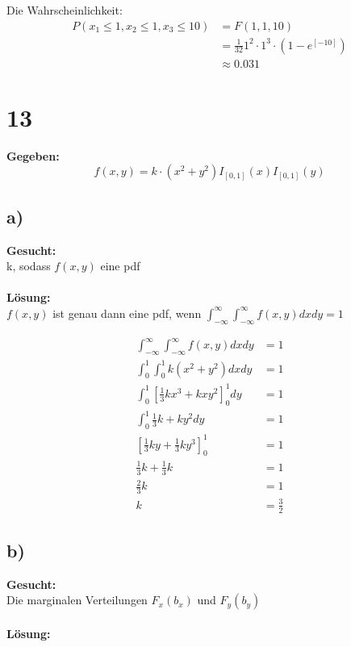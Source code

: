 \documentclass{article}
\begin{document}
Die Wahrscheinlichkeit:
\begin{align*}
    P(x_1 \leq 1, x_2 \leq 1, x_3 \leq 10) &= F(1, 1, 10 ) \\
    &= \frac{1}{32} 1^2 \cdot 1^3 \cdot (1- e^{[-10]}) \\
    &\approx 0.031
\end{align*}

\section*{13}
\textbf{Gegeben:}\\

\[f(x,y) = k \cdot (x^2 + y^2)I_{[0,1]}(x)I_{[0,1]}(y)\]
\subsection*{a)}
\textbf{Gesucht:} \\

k, sodass $f(x,y)$ eine pdf\\ \\
\textbf{Lösung:}\\

$f(x,y)$ ist genau dann eine pdf, wenn $\int_{-\infty}^{\infty}\int_{-\infty}^{\infty} f(x,y) dx dy = 1$

\begin{align*} 
    \int_{-\infty}^{\infty}\int_{-\infty}^{\infty} f(x,y) dx dy &= 1 \\
    \int_{0}^{1}\int_{0}^{1} k (x^2 + y^2) dx dy &= 1 \\
    \int_{0}^{1} \left[\frac{1}{3}k x^3 + kxy^2 \right]_0^1 dy &= 1 \\
    \int_{0}^{1} \frac{1}{3}k + ky^2  dy &= 1 \\
    \left[\frac{1}{3}ky + \frac{1}{3} ky^3\right]^1_0 &= 1 \\
    \frac{1}{3}k + \frac{1}{3}k &= 1 \\
    \frac{2}{3}k &= 1 \\
    k &= \frac{3}{2}
\end{align*}

\subsection*{b)}
\textbf{Gesucht:} \\

Die marginalen Verteilungen $F_x(b_x)$ und $F_y(b_y)$ \\ \\
\textbf{Lösung:} \\
\end{document}
